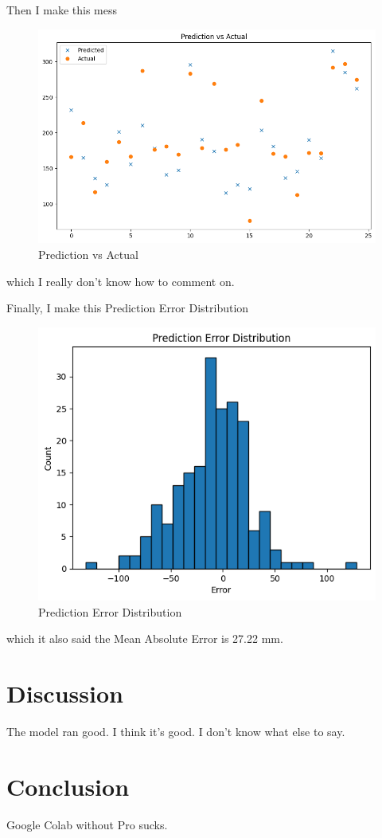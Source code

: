 \documentclass[conference]{IEEEtran}
\begin{document}
Then I make this mess
\begin{figure}[h]
    \centering
    \includegraphics[width=\linewidth]{eva2.png}
    \caption{Prediction vs Actual}
    \label{fig:Prediction vs Actual}
\end{figure}
which I really don't know how to comment on.

Finally, I make this Prediction Error Distribution
\begin{figure}[h]
    \centering
    \includegraphics[width=\linewidth]{eva3.png}
    \caption{Prediction Error Distribution}
    \label{fig:Prediction Error Distribution}
\end{figure}
which it also said the Mean Absolute Error is 27.22 mm.

\section{Discussion}
The model ran good. I think it's good. I don't know what else to say.

\section{Conclusion}
Google Colab without Pro sucks.
\end{document}
